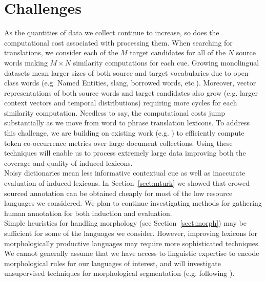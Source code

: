 \documentclass{article}
\newcommand{\secref}[1]{Section~\ref{#1}}
\begin{document}


\section{Challenges}

As the quantities of data we collect continue to increase, so does the computational cost associated with processing them.  When searching for translations, we consider each of the $M$ target candidates for all of the $N$ source words making $M \times N$ similarity computations for each cue.  Growing monolingual datasets mean larger sizes of both source and target vocabularies due to open-class words (e.g. Named Entities, slang, borrowed words, etc.).  Moreover, vector representations of both source words and target candidates also grow (e.g. larger context vectors and temporal distributions) requiring more cycles for each similarity computation.  Needless to say, the computational costs jump substantially as we move from word to phrase translation lexicons.  To address this challenge, we are building on existing work  (e.g. \cite{LiChurchHastieNIPS08,Li:2010,VanDurmeLallIJCAI09,VanDurmeLallNIPS09,VanDurmeLallACL10}) to efficiently compute token co-occurrence metrics over large document collections. Using these techniques will enable us to process extremely large data improving both the coverage and quality of induced lexicons.\\

Noisy dictionaries mean less informative contextual cue as well as inaccurate evaluation of induced lexicons. In \secref{sect:mturk} we showed that crowed-sourced annotation can be obtained cheaply for most of the low resource languages we considered.  We plan to continue investigating methods for gathering human annotation for both induction and evaluation.\\

Simple heuristics for handling morphology (see \secref{sect:morph}) may be sufficient for some of the languages we consider.  However, improving lexicons for morphologically productive languages may require more sophisticated techniques.  We cannot generally assume that we have access to linguistic expertise to encode morphological rules for our languages of interest, and will investigate unsupervised techniques for morphological segmentation (e.g. following \cite{Snyder:2008, Poon:2009a}).\\
\end{document}

